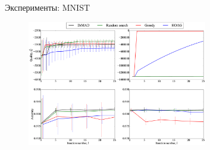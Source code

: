 \documentclass[10pt,pdf,utf8,russian,aspectratio=169]{beamer}
\begin{document}
\begin{frame}{Эксперименты: MNIST}
\begin{figure}  
\includegraphics[width=0.7\textwidth]{Fig_mnist.eps}
\end{figure}
\end{frame}
\end{document}
